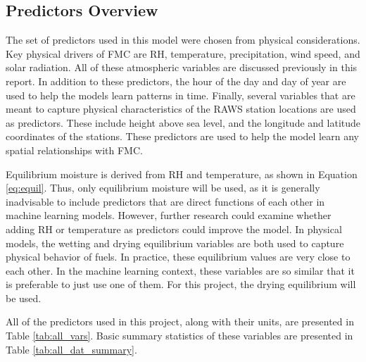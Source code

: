 \documentclass[11pt]{article}%
\begin{document}
\subsection{Predictors Overview}

The set of predictors used in this model were chosen from physical considerations. Key physical drivers of FMC are RH, temperature, precipitation, wind speed, and solar radiation. All of these atmospheric variables are discussed previously in this report. In addition to these predictors, the hour of the day and day of year are used to help the models learn patterns in time. Finally, several variables that are meant to capture physical characteristics of the RAWS station locations are used as predictors. These include height above sea level, and the longitude and latitude coordinates of the stations. These predictors are used to help the model learn any spatial relationships with FMC.

Equilibrium moisture is derived from RH and temperature, as shown in Equation \ref{eq:equil}. Thus, only equilibrium moisture will be used, as it is generally inadvisable to include predictors that are direct functions of each other in machine learning models. However, further research could examine whether adding RH or temperature as predictors could improve the model. In physical models, the wetting and drying equilibrium variables are both used to capture physical behavior of fuels. In practice, these equilibrium values are very close to each other. In the machine learning context, these variables are so similar that it is preferable to just use one of them. For this project, the drying equilibrium will be used. 

All of the predictors used in this project, along with their units, are presented in Table \ref{tab:all_vars}. Basic summary statistics of these variables are presented in Table \ref{tab:all_dat_summary}.
\end{document}
